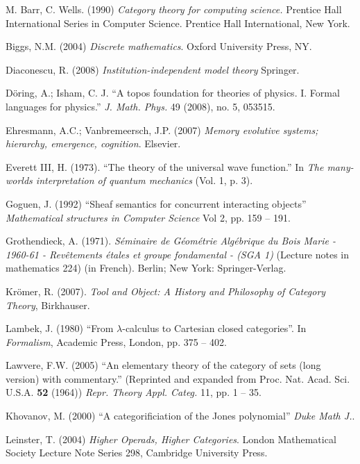 \documentclass[a4paper]{book}
\theoremstyle{myth}
\begin{document}
\begin{russian}
\begin{thebibliography}{SGWB}
 M. Barr, C. Wells. (1990) {\em Category theory for computing science.} Prentice Hall International Series in Computer Science. Prentice Hall International, New York.

 Biggs, N.M. (2004) {\em Discrete mathematics}. Oxford University Press, NY. 

 Diaconescu, R. (2008) {\em Institution-independent model theory} Springer.

 D\"{o}ring, A.; Isham, C. J. “A topos foundation for theories of physics. I. Formal languages for physics.” 
{\em J. Math. Phys.} 49 (2008), no. 5, 053515.

 Ehresmann, A.C.; Vanbremeersch, J.P. (2007) {\em Memory evolutive systems; hierarchy, emergence, cognition}. Elsevier.

 Everett III, H. (1973). “The theory of the universal wave function.” In {\em The many-worlds interpretation of quantum mechanics} (Vol. 1, p. 3).

 Goguen, J. (1992) “Sheaf semantics for concurrent interacting objects” {\em Mathematical structures in Computer Science} Vol 2, pp. 159 -- 191.

 Grothendieck, A. (1971). {\em S\'eminaire de G\'eom\'etrie Alg\'ebrique du Bois Marie - 1960-61 - Rev\^etements \'etales et groupe fondamental - (SGA 1)} (Lecture notes in mathematics 224) (in French). Berlin; New York: Springer-Verlag.

 Kr\"{o}mer, R. (2007). {\em Tool and Object: A History and Philosophy of Category Theory}, Birkhauser.

 Lambek, J. (1980) “From $\lambda$-calculus to Cartesian closed categories”. In {\em Formalism}, Academic Press, London, pp. 375 -- 402.

 Lawvere, F.W. (2005) “An elementary theory of the category of sets (long version) with
   commentary.” (Reprinted and expanded from Proc. Nat. Acad. Sci. U.S.A. {\bf 52}
   (1964)) {\em Repr. Theory Appl. Categ.} 11, pp. 1 -- 35.
   
 Khovanov, M. (2000) “A categorificiation of the Jones polynomial” {\em Duke Math J.}.

 Leinster, T. (2004) {\em Higher Operads, Higher Categories}. London Mathematical Society Lecture Note Series 298, Cambridge University Press.


\end{thebibliography}
\end{russian}
\end{document}
